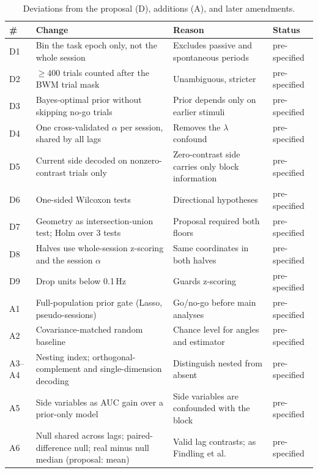 \documentclass{article}
\begin{document}
\begin{table}[H]
  \caption{Deviations from the proposal (D), additions (A), and later amendments.}
  \label{tab:amend}
  \centering\footnotesize
  \begin{tabularx}{\linewidth}{@{}l>{\raggedright\arraybackslash}X>{\raggedright\arraybackslash}X>{\raggedright\arraybackslash}p{2.3cm}@{}}
    \toprule
    \# & Change & Reason & Status \\
    \midrule
    D1 & Bin the task epoch only, not the whole session & Excludes passive and spontaneous periods & pre-specified \\
    D2 & $\ge 400$ trials counted after the BWM trial mask & Unambiguous, stricter & pre-specified \\
    D3 & Bayes-optimal prior without skipping no-go trials & Prior depends only on earlier stimuli & pre-specified \\
    D4 & One cross-validated $\alpha$ per session, shared by all lags & Removes the $\lambda$ confound & pre-specified \\
    D5 & Current side decoded on nonzero-contrast trials only & Zero-contrast side carries only block information & pre-specified \\
    D6 & One-sided Wilcoxon tests & Directional hypotheses & pre-specified \\
    D7 & Geometry as intersection-union test; Holm over 3 tests & Proposal required both floors & pre-specified \\
    D8 & Halves use whole-session z-scoring and the session $\alpha$ & Same coordinates in both halves & pre-specified \\
    D9 & Drop units below 0.1\,Hz & Guards z-scoring & pre-specified \\
    A1 & Full-population prior gate (Lasso, pseudo-sessions) & Go/no-go before main analyses & pre-specified \\
    A2 & Covariance-matched random baseline & Chance level for angles and estimator & pre-specified \\
    A3--A4 & Nesting index; orthogonal-complement and single-dimension decoding & Distinguish nested from absent & pre-specified \\
    A5 & Side variables as AUC gain over a prior-only model & Side variables are confounded with the block & pre-specified \\
    A6 & Null shared across lags; paired-difference null; real minus null median (proposal: mean) & Valid lag contrasts; as Findling et al. & pre-specified \\

\end{tabularx}
\end{table}
\end{document}
